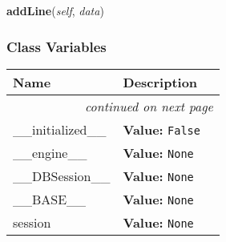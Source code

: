     \label{db_log:Database:addLine}

    \vspace{0.5ex}

\hspace{.8\funcindent}\begin{boxedminipage}{\funcwidth}

    \raggedright \textbf{addLine}(\textit{self}, \textit{data})

\setlength{\parskip}{2ex}
\setlength{\parskip}{1ex}
    \end{boxedminipage}



  \subsubsection{Class Variables}

    \vspace{-1cm}
\hspace{\varindent}\begin{longtable}{|p{\varnamewidth}|p{\vardescrwidth}|l}
\cline{1-2}
\cline{1-2} \centering \textbf{Name} & \centering \textbf{Description}& \\
\cline{1-2}
\endhead\cline{1-2}\multicolumn{3}{r}{\small\textit{continued on next page}}\\\endfoot\cline{1-2}
\endlastfoot\raggedright \_\-\_\-i\-n\-i\-t\-i\-a\-l\-i\-z\-e\-d\-\_\-\_\- & \raggedright \textbf{Value:} 
{\tt False}&\\
\cline{1-2}
\raggedright \_\-\_\-e\-n\-g\-i\-n\-e\-\_\-\_\- & \raggedright \textbf{Value:} 
{\tt None}&\\
\cline{1-2}
\raggedright \_\-\_\-D\-B\-S\-e\-s\-s\-i\-o\-n\-\_\-\_\- & \raggedright \textbf{Value:} 
{\tt None}&\\
\cline{1-2}
\raggedright \_\-\_\-B\-A\-S\-E\-\_\-\_\- & \raggedright \textbf{Value:} 
{\tt None}&\\
\cline{1-2}
\raggedright s\-e\-s\-s\-i\-o\-n\- & \raggedright \textbf{Value:} 
{\tt None}&\\
\cline{1-2}
\end{longtable}


